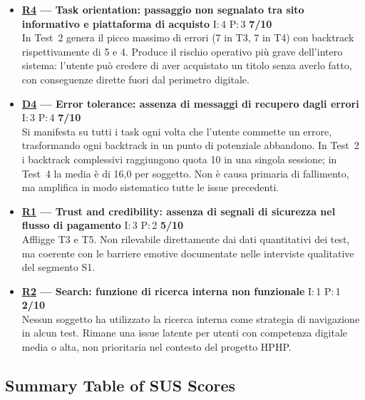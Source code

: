 \documentclass[11pt,a4paper]{article}
\begin{document}
\begin{tcolorbox}[colback=backgroundColor,colframe=borderColor,arc=2mm]
\begin{itemize}[leftmargin=*,itemsep=8pt]
    \item \textbf{\hyperref[iss:R4]{R4} --- Task orientation:
    passaggio non segnalato tra sito informativo e piattaforma
    di acquisto}
    \hfill I:\,4 \textbar{} P:\,3 \textbar{} \textbf{7/10}\\
    In Test~2 genera il picco massimo di errori 
    (7 in T3, 7 in T4) con backtrack rispettivamente di 5 e 4. 
    Produce il rischio operativo più grave dell'intero sistema: 
    l'utente può credere di aver acquistato un titolo senza averlo 
    fatto, con conseguenze dirette fuori dal perimetro digitale.

    \item \textbf{\hyperref[iss:D4]{D4} --- Error tolerance: 
    assenza di messaggi di recupero dagli errori}
    \hfill I:\,3 \textbar{} P:\,4 \textbar{} \textbf{7/10}\\
    Si manifesta su tutti i task ogni volta che l'utente commette un 
    errore, trasformando ogni backtrack in un punto di potenziale 
    abbandono. In Test~2 i backtrack complessivi raggiungono quota 10 
    in una singola sessione; in Test~4 la media è di 16,0 per soggetto. 
    Non è causa primaria di fallimento, ma amplifica in modo sistematico 
    tutte le issue precedenti.

    \item \textbf{\hyperref[iss:R1]{R1} --- Trust and credibility: 
    assenza di segnali di sicurezza nel flusso di pagamento}
    \hfill I:\,3 \textbar{} P:\,2 \textbar{} \textbf{5/10}\\
    Affligge T3 e T5. Non rilevabile direttamente dai dati quantitativi 
    dei test, ma coerente con le barriere emotive documentate nelle 
    interviste qualitative del segmento S1.

    \item \textbf{\hyperref[iss:R2]{R2} --- Search: 
    funzione di ricerca interna non funzionale}
    \hfill I:\,1 \textbar{} P:\,1 \textbar{} \textbf{2/10}\\
    Nessun soggetto ha utilizzato la ricerca interna come strategia 
    di navigazione in alcun test. Rimane una issue latente per utenti 
    con competenza digitale media o alta, non prioritaria nel contesto 
    del progetto HPHP.

\end{itemize}
\end{tcolorbox}

\vspace{1cm}

\subsection*{Summary Table of SUS Scores}
\end{document}
